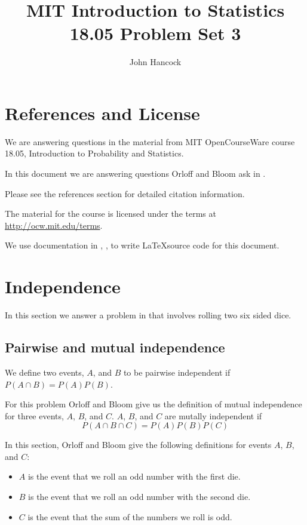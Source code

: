 \documentclass[a4paper,11pt]{article}
\author{John Hancock}
\title{MIT Introduction to Statistics 18.05 Problem Set 3 }
\begin{document}
\maketitle
\tableofcontents
\section{References and License}
We are answering questions in the material from MIT OpenCourseWare
course 18.05, Introduction to Probability and Statistics.

In this document we are answering questions Orloff and Bloom ask in
\cite{probSet3}.

Please see the references section for detailed citation information.

The material for the course is licensed under the terms at
\url{http://ocw.mit.edu/terms}.

We use documentation in \cite{vennDiagram}, \cite{nodePos}, \cite{plotPoints}
to write \LaTeX source code for this document.
\section{Independence}

In this section we answer a problem in \cite{probSet3} that involves rolling
two six sided dice.

\subsection{Pairwise and mutual independence}
We define two events, $A$, and $B$ to be pairwise independent if
$P \left( A \cap B \right) = P \left( A \right) P \left(B \right)$.

For this problem Orloff and Bloom give us the definition of mutual independence
for three events, $A$, $B$, and $C$.  $A$, $B$, and $C$ are mutally independent
if
\begin{equation}
	P \left( A \cap B \cap C\right)
	= P \left(A \right) P \left(B \right) P \left( C \right)
\end{equation}

In this section, Orloff and Bloom give the following definitions for events
$A$, $B$, and $C$:
\begin{itemize}
	\item $A$ is the event that we roll an odd number with the first die.
	\item $B$ is the event that we roll an odd number with the second die.
	\item $C$ is the event that the sum of the numbers we roll is odd.
\end{itemize}
\end{document}
